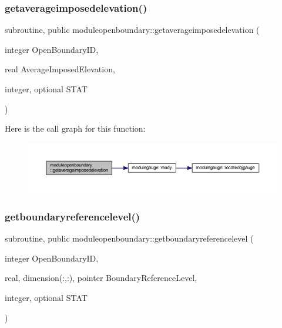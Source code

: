 \mbox{\label{namespacemoduleopenboundary_a52848b363ed0632be0c32b49a6d17cd4}} 
\subsubsection{\texorpdfstring{getaverageimposedelevation()}{getaverageimposedelevation()}}
{\footnotesize\ttfamily subroutine, public moduleopenboundary\+::getaverageimposedelevation (\begin{DoxyParamCaption}\item[{integer}]{Open\+Boundary\+ID,  }\item[{real}]{Average\+Imposed\+Elevation,  }\item[{integer, optional}]{S\+T\+AT }\end{DoxyParamCaption})}

Here is the call graph for this function\+:\nopagebreak
\begin{figure}[H]
\begin{center}
\leavevmode
\includegraphics[width=350pt]{namespacemoduleopenboundary_a52848b363ed0632be0c32b49a6d17cd4_cgraph}
\end{center}
\end{figure}
\mbox{\label{namespacemoduleopenboundary_a26e04e1ec6a8b2b4481ebb096e1c36b1}} 
\subsubsection{\texorpdfstring{getboundaryreferencelevel()}{getboundaryreferencelevel()}}
{\footnotesize\ttfamily subroutine, public moduleopenboundary\+::getboundaryreferencelevel (\begin{DoxyParamCaption}\item[{integer}]{Open\+Boundary\+ID,  }\item[{real, dimension(\+:,\+:), pointer}]{Boundary\+Reference\+Level,  }\item[{integer, optional}]{S\+T\+AT }\end{DoxyParamCaption})}


